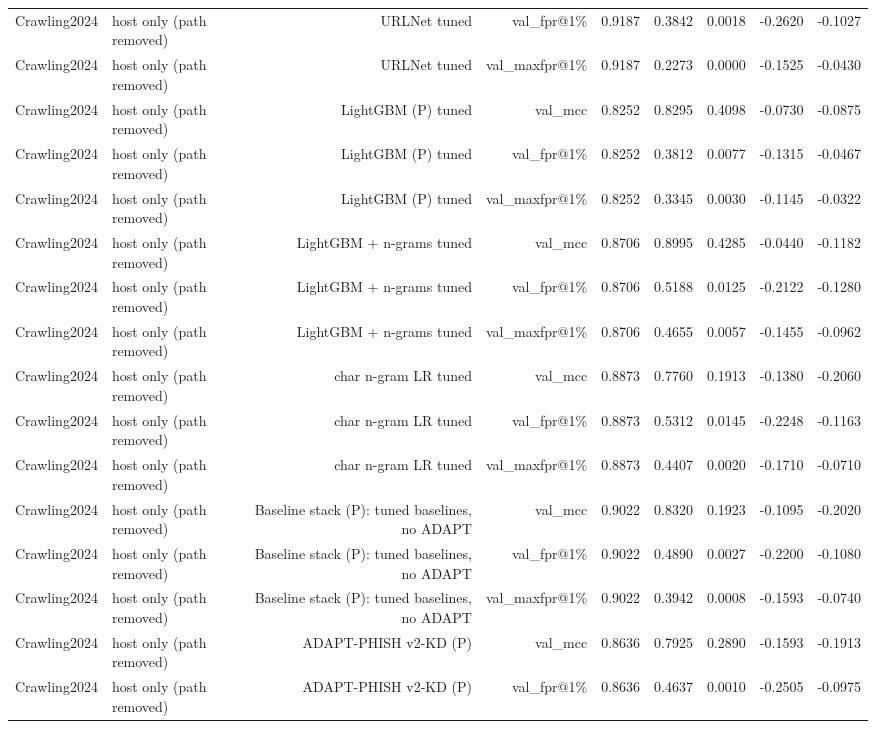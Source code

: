 \begin{table}[t]
\begin{tabular}{llrrrrrrr}
Crawling2024 & host only (path removed) & URLNet tuned & val\_fpr@1\% & 0.9187 & 0.3842 & 0.0018 & -0.2620 & -0.1027 \\
Crawling2024 & host only (path removed) & URLNet tuned & val\_maxfpr@1\% & 0.9187 & 0.2273 & 0.0000 & -0.1525 & -0.0430 \\
Crawling2024 & host only (path removed) & LightGBM (P) tuned & val\_mcc & 0.8252 & 0.8295 & 0.4098 & -0.0730 & -0.0875 \\
Crawling2024 & host only (path removed) & LightGBM (P) tuned & val\_fpr@1\% & 0.8252 & 0.3812 & 0.0077 & -0.1315 & -0.0467 \\
Crawling2024 & host only (path removed) & LightGBM (P) tuned & val\_maxfpr@1\% & 0.8252 & 0.3345 & 0.0030 & -0.1145 & -0.0322 \\
Crawling2024 & host only (path removed) & LightGBM + n-grams tuned & val\_mcc & 0.8706 & 0.8995 & 0.4285 & -0.0440 & -0.1182 \\
Crawling2024 & host only (path removed) & LightGBM + n-grams tuned & val\_fpr@1\% & 0.8706 & 0.5188 & 0.0125 & -0.2122 & -0.1280 \\
Crawling2024 & host only (path removed) & LightGBM + n-grams tuned & val\_maxfpr@1\% & 0.8706 & 0.4655 & 0.0057 & -0.1455 & -0.0962 \\
Crawling2024 & host only (path removed) & char n-gram LR tuned & val\_mcc & 0.8873 & 0.7760 & 0.1913 & -0.1380 & -0.2060 \\
Crawling2024 & host only (path removed) & char n-gram LR tuned & val\_fpr@1\% & 0.8873 & 0.5312 & 0.0145 & -0.2248 & -0.1163 \\
Crawling2024 & host only (path removed) & char n-gram LR tuned & val\_maxfpr@1\% & 0.8873 & 0.4407 & 0.0020 & -0.1710 & -0.0710 \\
Crawling2024 & host only (path removed) & Baseline stack (P): tuned baselines, no ADAPT & val\_mcc & 0.9022 & 0.8320 & 0.1923 & -0.1095 & -0.2020 \\
Crawling2024 & host only (path removed) & Baseline stack (P): tuned baselines, no ADAPT & val\_fpr@1\% & 0.9022 & 0.4890 & 0.0027 & -0.2200 & -0.1080 \\
Crawling2024 & host only (path removed) & Baseline stack (P): tuned baselines, no ADAPT & val\_maxfpr@1\% & 0.9022 & 0.3942 & 0.0008 & -0.1593 & -0.0740 \\
Crawling2024 & host only (path removed) & ADAPT-PHISH v2-KD (P) & val\_mcc & 0.8636 & 0.7925 & 0.2890 & -0.1593 & -0.1913 \\
Crawling2024 & host only (path removed) & ADAPT-PHISH v2-KD (P) & val\_fpr@1\% & 0.8636 & 0.4637 & 0.0010 & -0.2505 & -0.0975 \\

\end{tabular}
\end{table}

